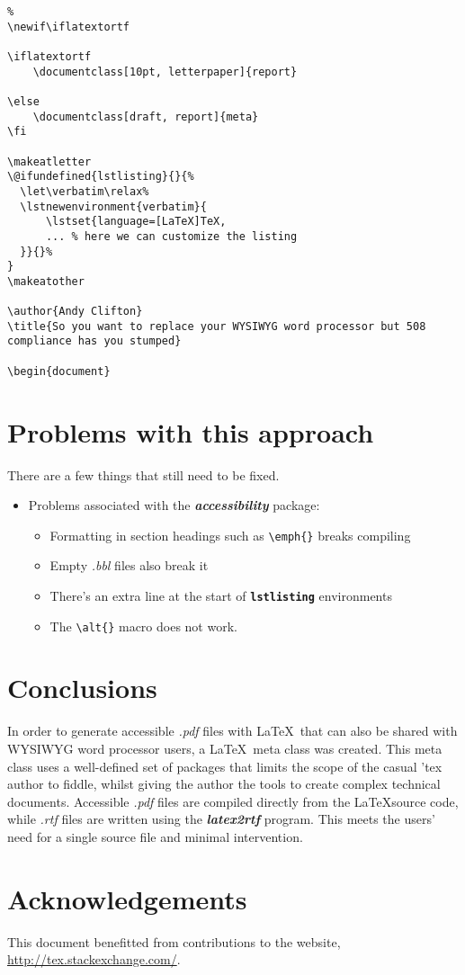 \documentclass[12pt,letterpaper]{article}
\newcommand{\fn}[1]{\emph{#1}}
\newcommand{\packagename}[1]{\textbf{\emph{#1}}}
\newcommand{\envname}[1]{\textbf{\texttt{#1}}}
\begin{document}
\begin{verbatim}%
\newif\iflatextortf

\iflatextortf
    \documentclass[10pt, letterpaper]{report}
    
\else
    \documentclass[draft, report]{meta} 
\fi

\makeatletter
\@ifundefined{lstlisting}{}{%
  \let\verbatim\relax%
  \lstnewenvironment{verbatim}{
      \lstset{language=[LaTeX]TeX,
      ... % here we can customize the listing
  }}{}%
}
\makeatother

\author{Andy Clifton}
\title{So you want to replace your WYSIWYG word processor but 508 compliance has you stumped}
 
\begin{document}

\end{verbatim}

\section{Problems with this approach}
There are a few things that still need to be fixed.

\begin{itemize}
\item Problems associated with the \packagename{accessibility} package:
\begin{itemize}
\item Formatting in section headings such as \verb+\emph{}+ breaks compiling
\item Empty \fn{.bbl} files also break it
\item There's an extra line at the start of \envname{lstlisting} environments
\item The \verb+\alt{}+ macro does not work.
\end{itemize}
\end{itemize}

\section{Conclusions}
In order to generate accessible \fn{.pdf} files with \LaTeX\ that can also be shared with WYSIWYG word processor users, a \LaTeX\ meta class was created. This meta class uses a well-defined set of packages that limits the scope of the casual 'tex author to fiddle, whilst giving the author the tools to create complex technical documents. Accessible \fn{.pdf} files are compiled directly from the \LaTeX source code, while \fn{.rtf} files are written using the \packagename{latex2rtf} program. This meets the users' need for a single source file and minimal intervention.

\section*{Acknowledgements}
This document benefitted from contributions to the website, \url{http://tex.stackexchange.com/}.
\end{document}

